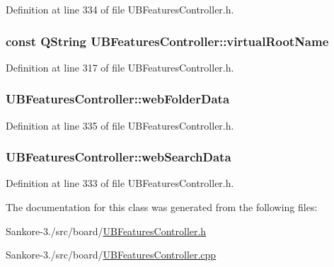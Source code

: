Definition at line 334 of file U\-B\-Features\-Controller.\-h.

\hypertarget{class_u_b_features_controller_a825c2a585ff035f542f38d3eec0b6cbe}{
\subsubsection[{virtual\-Root\-Name}]{\setlength{\rightskip}{0pt plus 5cm}const Q\-String U\-B\-Features\-Controller\-::virtual\-Root\-Name\hspace{0.3cm}{\ttfamily [static]}}}\label{d8/d33/class_u_b_features_controller_a825c2a585ff035f542f38d3eec0b6cbe}


Definition at line 317 of file U\-B\-Features\-Controller.\-h.

\hypertarget{class_u_b_features_controller_aa1716f370611e4e5de267ed6d0d6f0fd}{
\subsubsection[{web\-Folder\-Data}]{ U\-B\-Features\-Controller\-::web\-Folder\-Data}}\label{d8/d33/class_u_b_features_controller_aa1716f370611e4e5de267ed6d0d6f0fd}


Definition at line 335 of file U\-B\-Features\-Controller.\-h.

\hypertarget{class_u_b_features_controller_a9f8defc86c89aed213113200a3dc37a6}{
\subsubsection[{web\-Search\-Data}]{ U\-B\-Features\-Controller\-::web\-Search\-Data}}\label{d8/d33/class_u_b_features_controller_a9f8defc86c89aed213113200a3dc37a6}


Definition at line 333 of file U\-B\-Features\-Controller.\-h.



The documentation for this class was generated from the following files\-:\begin{DoxyCompactItemize}
\item 
Sankore-\/3./src/board/\hyperlink{_u_b_features_controller_8h}{U\-B\-Features\-Controller.\-h}\item 
Sankore-\/3./src/board/\hyperlink{_u_b_features_controller_8cpp}{U\-B\-Features\-Controller.\-cpp}\end{DoxyCompactItemize}
